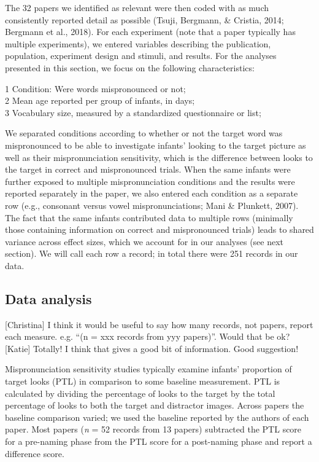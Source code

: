 \documentclass[man]{apa6}
\theoremstyle{definition}
\theoremstyle{definition}
\theoremstyle{definition}
\theoremstyle{remark}
\begin{document}
The 32 papers we identified as relevant were then coded with as much
consistently reported detail as possible (Tsuji, Bergmann, \& Cristia,
2014; Bergmann et al., 2018). For each experiment (note that a paper
typically has multiple experiments), we entered variables describing the
publication, population, experiment design and stimuli, and results. For
the analyses presented in this section, we focus on the following
characteristics:

1 Condition: Were words mispronounced or not;\\
2 Mean age reported per group of infants, in days;\\
3 Vocabulary size, measured by a standardized questionnaire or list;

We separated conditions according to whether or not the target word was
mispronounced to be able to investigate infants' looking to the target
picture as well as their mispronunciation sensitivity, which is the
difference between looks to the target in correct and mispronounced
trials. When the same infants were further exposed to multiple
mispronunciation conditions and the results were reported separately in
the paper, we also entered each condition as a separate row (e.g.,
consonant versus vowel mispronunciations; Mani \& Plunkett, 2007). The
fact that the same infants contributed data to multiple rows (minimally
those containing information on correct and mispronounced trials) leads
to shared variance across effect sizes, which we account for in our
analyses (see next section). We will call each row a record; in total
there were 251 records in our data.

\subsection{Data analysis}\label{data-analysis}

{[}Christina{]} I think it would be useful to say how many records, not
papers, report each measure. e.g. \enquote{(n = xxx records from yyy
papers)}. Would that be ok? {[}Katie{]} Totally! I think that gives a
good bit of information. Good suggestion!

Mispronunciation sensitivity studies typically examine infants'
proportion of target looks (PTL) in comparison to some baseline
measurement. PTL is calculated by dividing the percentage of looks to
the target by the total percentage of looks to both the target and
distractor images. Across papers the baseline comparison varied; we used
the baseline reported by the authors of each paper. Most papers
(\emph{n} = 52 records from 13 papers) subtracted the PTL score for a
pre-naming phase from the PTL score for a post-naming phase and report a
difference score.
\end{document}
